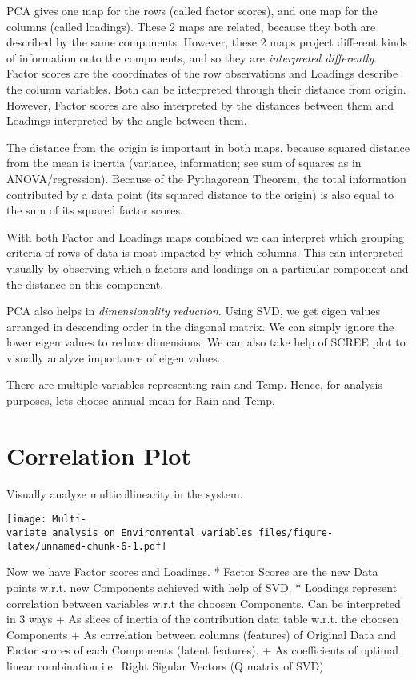 \documentclass[]{book}
\begin{document}
PCA gives one map for the rows (called factor scores), and one map for
the columns (called loadings). These 2 maps are related, because they
both are described by the same components. However, these 2 maps project
different kinds of information onto the components, and so they are
\emph{interpreted differently}. Factor scores are the coordinates of the
row observations and Loadings describe the column variables. Both can be
interpreted through their distance from origin. However, Factor scores
are also interpreted by the distances between them and Loadings
interpreted by the angle between them.

The distance from the origin is important in both maps, because squared
distance from the mean is inertia (variance, information; see sum of
squares as in ANOVA/regression). Because of the Pythagorean Theorem, the
total information contributed by a data point (its squared distance to
the origin) is also equal to the sum of its squared factor scores.

With both Factor and Loadings maps combined we can interpret which
grouping criteria of rows of data is most impacted by which columns.
This can interpreted visually by observing which a factors and loadings
on a particular component and the distance on this component.

PCA also helps in \emph{dimensionality reduction}. Using SVD, we get
eigen values arranged in descending order in the diagonal matrix. We can
simply ignore the lower eigen values to reduce dimensions. We can also
take help of SCREE plot to visually analyze importance of eigen values.

There are multiple variables representing rain and Temp. Hence, for
analysis purposes, lets choose annual mean for Rain and Temp.

\hypertarget{correlation-plot}{%
\section{Correlation Plot}\label{correlation-plot}}

Visually analyze multicollinearity in the system.

\texttt{[image: Multi-variate\_analysis\_on\_Environmental\_variables\_files/figure-latex/unnamed-chunk-6-1.pdf]}

Now we have Factor scores and Loadings. * Factor Scores are the new Data
points w.r.t. new Components achieved with help of SVD. * Loadings
represent correlation between variables w.r.t the choosen Components.
Can be interpreted in 3 ways + As slices of inertia of the contribution
data table w.r.t. the choosen Components + As correlation between
columns (features) of Original Data and Factor scores of each Components
(latent features). + As coefficients of optimal linear combination
i.e.~Right Sigular Vectors (Q matrix of SVD)
\end{document}
